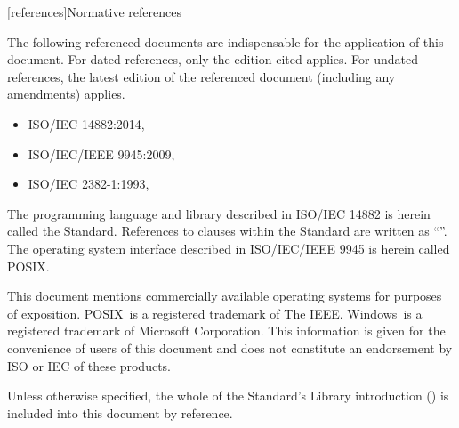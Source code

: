 
[references]{Normative references}

\pnum
The following referenced documents are indispensable for the application of this document. For dated references, only the edition cited applies. For undated references, the latest edition of the referenced document (including any amendments) applies.

\begin{itemize}
\item ISO/IEC 14882:2014, 
\item ISO/IEC/IEEE 9945:2009, 
\item ISO/IEC 2382-1:1993, 
\end{itemize}

\pnum
The programming language and library described in ISO/IEC 14882 is herein called the \Cpp Standard.
References to clauses within the \Cpp Standard are written as ``''.
The operating system interface described in ISO/IEC/IEEE 9945 is herein called POSIX.

\pnum
This document mentions commercially available operating systems for purposes of exposition.  POSIX\textregistered\ is a registered trademark of The IEEE. Windows\textregistered\ is a registered trademark of Microsoft Corporation. This information is given for the convenience of users of this document and does not constitute an endorsement by ISO or IEC of these products.

\pnum
Unless otherwise specified, the whole of the \Cpp Standard's Library introduction () is included into this document by reference.


